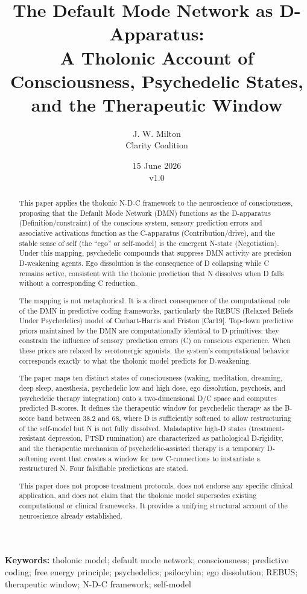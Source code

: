 \documentclass[12pt]{article}
\title{The Default Mode Network as D-Apparatus:\\
\large A Tholonic Account of Consciousness, Psychedelic States, and the Therapeutic Window}
\author{J. W. Milton\\[4pt]{\small Clarity Coalition}}
\date{\small 15 June 2026 \\ v1.0}
\begin{document}
\maketitle

\noindent\textbf{Keywords:} tholonic model; default mode network; consciousness; predictive coding; free energy principle; psychedelics; psilocybin; ego dissolution; REBUS; therapeutic window; N-D-C framework; self-model

\begin{abstract}
This paper applies the tholonic N-D-C framework to the neuroscience of
consciousness, proposing that the Default Mode Network (DMN) functions
as the D-apparatus (Definition/constraint) of the conscious system,
sensory prediction errors and associative activations function as the
C-apparatus (Contribution/drive), and the stable sense of self (the
``ego'' or self-model) is the emergent N-state (Negotiation). Under this
mapping, psychedelic compounds that suppress DMN activity are precision
D-weakening agents. Ego dissolution is the consequence of D collapsing
while C remains active, consistent with the tholonic prediction that N
dissolves when D falls without a corresponding C reduction.

The mapping is not metaphorical. It is a direct consequence of the
computational role of the DMN in predictive coding frameworks,
particularly the REBUS (Relaxed Beliefs Under Psychedelics) model of
Carhart-Harris and Friston {[}Car19{]}. Top-down predictive priors
maintained by the DMN are computationally identical to D-primitives:
they constrain the influence of sensory prediction errors (C) on
conscious experience. When these priors are relaxed by serotonergic
agonists, the system's computational behavior corresponds exactly to
what the tholonic model predicts for D-weakening.

The paper maps ten distinct states of consciousness (waking, meditation,
dreaming, deep sleep, anesthesia, psychedelic low and high dose, ego
dissolution, psychosis, and psychedelic therapy integration) onto a
two-dimensional D/C space and computes predicted B-scores. It defines
the therapeutic window for psychedelic therapy as the B-score band
between 38.2 and 68, where D is sufficiently softened to allow
restructuring of the self-model but N is not fully dissolved.
Maladaptive high-D states (treatment-resistant depression, PTSD
rumination) are characterized as pathological D-rigidity, and the
therapeutic mechanism of psychedelic-assisted therapy is a temporary
D-softening event that creates a window for new C-connections to
instantiate a restructured N. Four falsifiable predictions are stated.

This paper does not propose treatment protocols, does not endorse any
specific clinical application, and does not claim that the tholonic
model supersedes existing computational or clinical frameworks. It
provides a unifying structural account of the neuroscience already
established.
\end{abstract}
\end{document}
